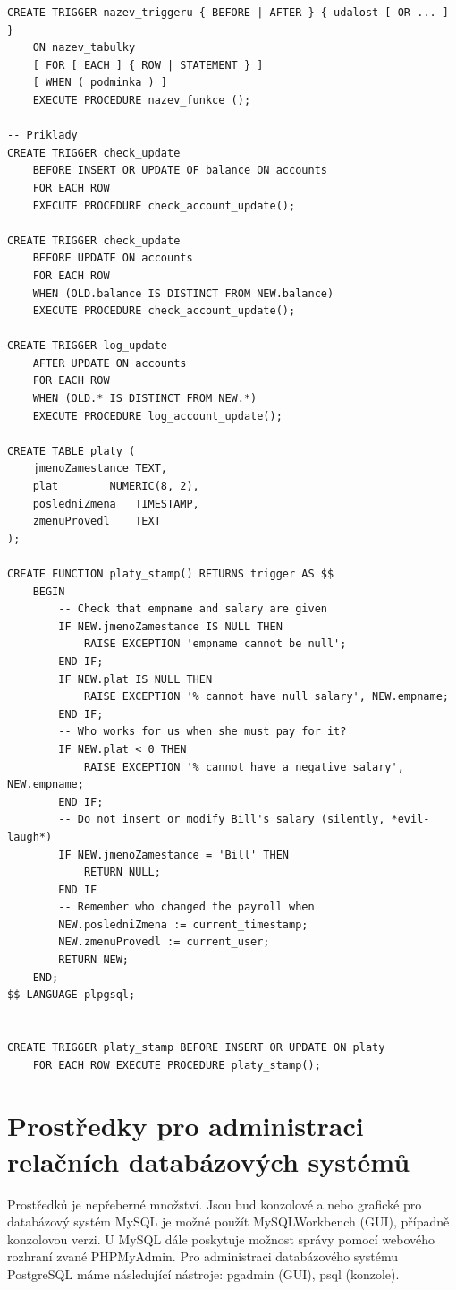 \documentclass[10pt,a4paper]{article}
\begin{document}
\begin{lstlisting}
CREATE TRIGGER nazev_triggeru { BEFORE | AFTER } { udalost [ OR ... ] }
    ON nazev_tabulky
    [ FOR [ EACH ] { ROW | STATEMENT } ]
    [ WHEN ( podminka ) ]
    EXECUTE PROCEDURE nazev_funkce ();

-- Priklady
CREATE TRIGGER check_update
    BEFORE INSERT OR UPDATE OF balance ON accounts
    FOR EACH ROW
    EXECUTE PROCEDURE check_account_update();
	
CREATE TRIGGER check_update
    BEFORE UPDATE ON accounts
    FOR EACH ROW
    WHEN (OLD.balance IS DISTINCT FROM NEW.balance)
    EXECUTE PROCEDURE check_account_update();
	
CREATE TRIGGER log_update
    AFTER UPDATE ON accounts
    FOR EACH ROW
    WHEN (OLD.* IS DISTINCT FROM NEW.*)
    EXECUTE PROCEDURE log_account_update();

CREATE TABLE platy (
    jmenoZamestance	TEXT,
    plat		NUMERIC(8, 2),
    posledniZmena	TIMESTAMP,
    zmenuProvedl	TEXT
);

CREATE FUNCTION platy_stamp() RETURNS trigger AS $$
    BEGIN
        -- Check that empname and salary are given
        IF NEW.jmenoZamestance IS NULL THEN
            RAISE EXCEPTION 'empname cannot be null';
        END IF;
        IF NEW.plat IS NULL THEN
            RAISE EXCEPTION '% cannot have null salary', NEW.empname;
        END IF;
        -- Who works for us when she must pay for it?
        IF NEW.plat < 0 THEN
            RAISE EXCEPTION '% cannot have a negative salary', NEW.empname;
        END IF;		
        -- Do not insert or modify Bill's salary (silently, *evil-laugh*)
        IF NEW.jmenoZamestance = 'Bill' THEN
            RETURN NULL;
        END IF
        -- Remember who changed the payroll when
        NEW.posledniZmena := current_timestamp;
        NEW.zmenuProvedl := current_user;
        RETURN NEW;
    END;
$$ LANGUAGE plpgsql;


CREATE TRIGGER platy_stamp BEFORE INSERT OR UPDATE ON platy
    FOR EACH ROW EXECUTE PROCEDURE platy_stamp();
\end{lstlisting}

\section{Prostředky pro administraci relačních databázových systémů}
Prostředků je nepřeberné množství. Jsou bud konzolové a nebo grafické pro databázový systém MySQL je možné použít MySQLWorkbench (GUI), případně konzolovou verzi. U MySQL dále poskytuje možnost správy pomocí webového rozhraní zvané PHPMyAdmin. Pro administraci databázového systému PostgreSQL máme následující nástroje: pgadmin (GUI), psql (konzole).
\end{document}
